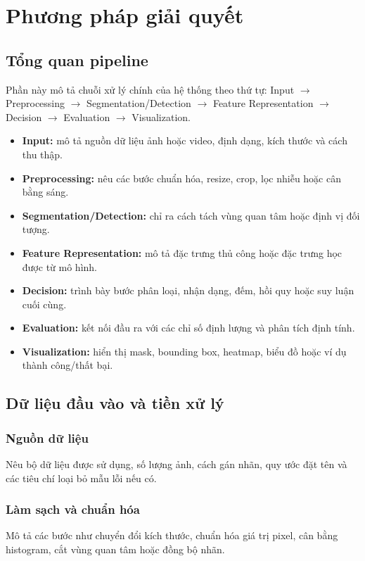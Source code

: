 \chapter{Phương pháp giải quyết}

\section{Tổng quan pipeline}
Phần này mô tả chuỗi xử lý chính của hệ thống theo thứ tự: Input $\rightarrow$ Preprocessing $\rightarrow$ Segmentation/Detection $\rightarrow$ Feature Representation $\rightarrow$ Decision $\rightarrow$ Evaluation $\rightarrow$ Visualization.

\begin{itemize}
    \item \textbf{Input:} mô tả nguồn dữ liệu ảnh hoặc video, định dạng, kích thước và cách thu thập.
    \item \textbf{Preprocessing:} nêu các bước chuẩn hóa, resize, crop, lọc nhiễu hoặc cân bằng sáng.
    \item \textbf{Segmentation/Detection:} chỉ ra cách tách vùng quan tâm hoặc định vị đối tượng.
    \item \textbf{Feature Representation:} mô tả đặc trưng thủ công hoặc đặc trưng học được từ mô hình.
    \item \textbf{Decision:} trình bày bước phân loại, nhận dạng, đếm, hồi quy hoặc suy luận cuối cùng.
    \item \textbf{Evaluation:} kết nối đầu ra với các chỉ số định lượng và phân tích định tính.
    \item \textbf{Visualization:} hiển thị mask, bounding box, heatmap, biểu đồ hoặc ví dụ thành công/thất bại.
\end{itemize}

\section{Dữ liệu đầu vào và tiền xử lý}
\subsection{Nguồn dữ liệu}
Nêu bộ dữ liệu được sử dụng, số lượng ảnh, cách gán nhãn, quy ước đặt tên và các tiêu chí loại bỏ mẫu lỗi nếu có.

\subsection{Làm sạch và chuẩn hóa}
Mô tả các bước như chuyển đổi kích thước, chuẩn hóa giá trị pixel, cân bằng histogram, cắt vùng quan tâm hoặc đồng bộ nhãn.


